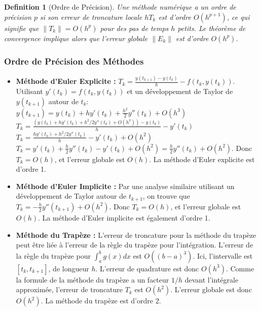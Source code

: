 \documentclass{article}
\newtheorem{definition}{Definition}
\begin{document}
\begin{definition}[Ordre de Précision]
Une méthode numérique a un ordre de précision $p$ si son erreur de troncature locale $h T_k$ est d'ordre $O(h^{p+1})$, ce qui signifie que $\|T_k\| = O(h^p)$ pour des pas de temps $h$ petits. Le théorème de convergence implique alors que l'erreur globale $\|E_k\|$ est d'ordre $O(h^p)$.
\end{definition}

\subsubsection*{Ordre de Précision des Méthodes}

\begin{itemize}
    \item \textbf{Méthode d'Euler Explicite :} $T_k = \frac{y(t_{k+1}) - y(t_k)}{h} - f(t_k, y(t_k))$. Utilisant $y'(t_k) = f(t_k, y(t_k))$ et un développement de Taylor de $y(t_{k+1})$ autour de $t_k$:
    $y(t_{k+1}) = y(t_k) + h y'(t_k) + \frac{h^2}{2} y''(t_k) + O(h^3)$
    $T_k = \frac{(y(t_k) + h y'(t_k) + h^2/2 y''(t_k) + O(h^3)) - y(t_k)}{h} - y'(t_k)$
    $T_k = \frac{h y'(t_k) + h^2/2 y''(t_k)}{h} - y'(t_k) + O(h^2)$
    $T_k = y'(t_k) + \frac{h}{2} y''(t_k) - y'(t_k) + O(h^2) = \frac{h}{2} y''(t_k) + O(h^2)$.
    Donc $T_k = O(h)$, et l'erreur globale est $O(h)$. La méthode d'Euler explicite est d'ordre 1.

    \item \textbf{Méthode d'Euler Implicite :} Par une analyse similaire utilisant un développement de Taylor autour de $t_{k+1}$, on trouve que $T_k = -\frac{h}{2} y''(t_{k+1}) + O(h^2)$. Donc $T_k = O(h)$, et l'erreur globale est $O(h)$. La méthode d'Euler implicite est également d'ordre 1.

    \item \textbf{Méthode du Trapèze :} L'erreur de troncature pour la méthode du trapèze peut être liée à l'erreur de la règle du trapèze pour l'intégration. L'erreur de la règle du trapèze pour $\int_a^b g(x) dx$ est $O((b-a)^3)$. Ici, l'intervalle est $[t_k, t_{k+1}]$, de longueur $h$. L'erreur de quadrature est donc $O(h^3)$. Comme la formule de la méthode du trapèze a un facteur $1/h$ devant l'intégrale approximée, l'erreur de troncature $T_k$ est $O(h^2)$. L'erreur globale est donc $O(h^2)$. La méthode du trapèze est d'ordre 2.
\end{itemize}
\end{document}
